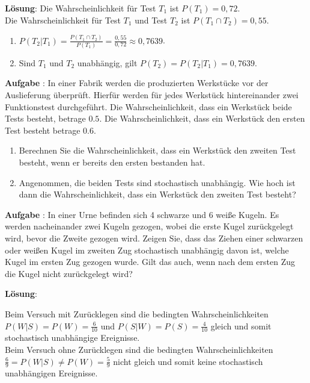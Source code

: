 \documentclass[a4paper,13pt]{scrartcl}
\newcommand{\exercise}{\vspace*{0.2cm}
\stepcounter{aufgabe}
\noindent
\textbf{Aufgabe \arabic{aufgabe}}: }
\newcounter{aufgabe}
\newcommand{\solution}{\vspace*{0.2cm}
\noindent
\textbf{Lösung}: }
\begin{document}
\solution
Die Wahrscheinlichkeit für  Test $T_1$  ist $P(T_1) = 0,72$.\\
Die Wahrscheinlichkeit für  Test $T_1$ und Test $T_2$ ist $P(T_1 \cap T_2) = 0,55$.
\begin{enumerate}[label=(\alph*)]
\item $P(T_2 | T_1) = \frac{P(T_1 \cap T_2)}{P(T_1)} = \frac{0,55} {0,72} \approx 0,7639$.

\item Sind $T_1$ und $T_2$ unabhängig, gilt  $P(T_2) = P(T_2 | T_1) = 0,7639$.

\end{enumerate}
\vspace{8mm}


\exercise
In einer Fabrik werden die produzierten Werkstücke vor der Auslieferung überprüft. Hierfür werden für jedes Werkstück  hintereinander zwei Funktionstest durchgeführt.  Die Wahrscheinlichkeit, dass ein Werkstück beide Tests besteht, betrage $0.5$. Die Wahrscheinlichkeit, dass ein Werkstück  den ersten Test besteht betrage $0.6$.  
\begin{enumerate}[label=(\alph*)]
\item Berechnen Sie die Wahrscheinlichkeit, dass ein Werkstück den zweiten Test besteht, wenn er bereits den ersten bestanden hat.
\item Angenommen, die beiden Tests sind stochastisch unabhängig. Wie hoch ist dann die Wahrscheinlichkeit, dass ein Werkstück den zweiten Test besteht?
\end{enumerate}
\vspace{8mm}


\exercise
In einer Urne befinden sich 4 schwarze und 6 weiße Kugeln.
Es werden nacheinander zwei Kugeln gezogen, wobei die erste Kugel zurückgelegt wird, bevor die Zweite gezogen wird.
Zeigen Sie, dass das Ziehen einer schwarzen oder weißen Kugel im zweiten Zug stochastisch unabhängig davon ist, welche Kugel im ersten Zug gezogen wurde.
Gilt das auch, wenn nach dem ersten Zug die Kugel nicht zurückgelegt wird?
\vspace{8mm}

\solution

Beim Versuch mit Zurücklegen sind die bedingten Wahrscheinlichkeiten $P(W|S) = P(W) = \frac{6}{10}$ und $P(S |W) = P(S  ) = \frac{4}{10}$ gleich und somit stochastisch unabhängige Ereignisse.\\
Beim Versuch ohne Zurücklegen sind die bedingten Wahrscheinlichkeiten $ \frac{6}{9} = P(W|S) \neq P(W) =  \frac{5}{9}$  nicht gleich und somit keine stochastisch unabhängigen Ereignisse.
\vspace{8mm}
\end{document}
